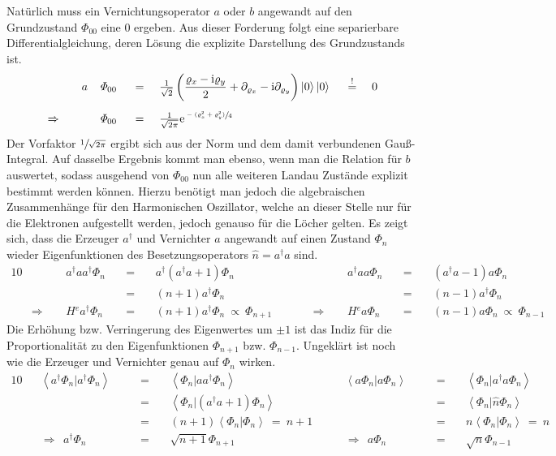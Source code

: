 \documentclass[a4paper,11pt, twoside]{article}
\newcommand{\ind}[2]{{_{#1}^{#2}}}
\newcommand{\+}{\dagger}
\newcommand{\bra}{\left \langle}
\newcommand{\ck}{\left |}
\newcommand{\ket}{\right \rangle}
\renewcommand{\'}{\tt\textquotesingle}
\renewcommand{\a}{a\ind{}{\+}}
\renewcommand{\exp}[1]{\tt{e}^{#1}}
\renewcommand{\it}{\mathit}
\renewcommand{\^}{\hat}
\renewcommand{\tt}{\text}
\renewcommand{\~}{\widetilde}
\begin{document}
Natürlich muss ein Vernichtungsoperator $a$ oder $b$ angewandt auf den Grundzustand $\it{\Phi}_{00}$ eine $0$ ergeben. Aus dieser Forderung folgt eine separierbare Differentialgleichung, deren Lösung die explizite Darstellung des Grundzustands ist. 
\begin{alignat*}{7}
& && a&&\it{\Phi}_{00} &&\ =\ && \tfrac{1}{\sqrt{2}}\left (\frac{\varrho_x -\tt i\varrho_y}{2}+\partial_{\varrho_x}-\tt i \partial_{\varrho_y}\right )\ck 0\ket \ck 0\ket &&\ \stackrel{!}{=} \ &&0 \\[5pt]
& \Rightarrow  \quad  && &&\it{\Phi}_{00} &&\ = \ && \tfrac{1}{\sqrt{2\pi}}\exp{\sfrac{-(\varrho_x ^2 + \varrho_y ^2)}{4}}
\end{alignat*}
Der Vorfaktor $\sfrac{1}{\sqrt{2\pi}}$ ergibt sich aus der Norm und dem damit verbundenen Gauß-Integral. Auf dasselbe Ergebnis kommt man ebenso, wenn man die Relation für $b$ auswertet, sodass ausgehend von $\it{\Phi}_{00}$ nun alle weiteren Landau Zustände explizit bestimmt werden können. Hierzu benötigt man jedoch die algebraischen Zusammenhänge für den Harmonischen Oszillator, welche an dieser Stelle nur für die Elektronen aufgestellt werden, jedoch genauso für die Löcher gelten. Es zeigt sich, dass die Erzeuger $a\ind{}{\+}$ und Vernichter $a$ angewandt auf einen Zustand  $\it\Phi_{n}$ wieder Eigenfunktionen des Besetzungsoperators  $\^n = a\ind{}{\+}a$ sind. 
\begin{alignat*}{10}
& &&a\ind{}{\+}aa\ind{}{\+}\it{\Phi}_{n} &&\ = \ && a\ind{}{\+}(a\ind{}{\+}a+1)\it{\Phi}_{n}  &&
   	&&a\ind{}{\+}aa \it{\Phi}_{n} &&\ = \ && (a\ind{}{\+}a-1)a\it{\Phi}_{n} \\
& &&  &&\ = \ && (n+1)a\ind{}{\+}\it{\Phi}_{n}  && 
	&&  &&\ = \ && (n-1)a\ind{}{\+}\it{\Phi}_{n} \\[6pt]
& \Rightarrow  \ \ && H\ind{}{e}  a\ind{}{\+}\it{\Phi}_{n}  &&\ = \ && (n+1)a\ind{}{\+}\it{\Phi}_{n}\ \propto \ \it{\Phi}_{n+1} \qquad  &&
  \Rightarrow  \ \ &&  H\ind{}{e} a \it{\Phi}_{n}  &&\ = \ && (n-1)a \it{\Phi}_{n}\ \propto \ \it{\Phi}_{n-1}
\end{alignat*}
Die Erhöhung bzw. Verringerung des Eigenwertes um $\pm1$ ist das Indiz für die Proportionalität zu den Eigenfunktionen $\it{\Phi}_{n+1}$ bzw. $\it{\Phi}_{n-1}$. Ungeklärt ist noch wie die Erzeuger und Vernichter genau auf $\it{\Phi}_n$ wirken. 
\begin{alignat*}{10}
& &\bra \a \it{\Phi}_{n} |\a \it{\Phi}_{n}  \ket & &&\ = \ && \bra  \it{\Phi}_{n} |a\a \it{\Phi}_{n}  \ket  && \ \
   	&\bra a \it{\Phi}_{n} |a \it{\Phi}_{n}  \ket & &&\ = \ && \bra  \it{\Phi}_{n} |\a a \it{\Phi}_{n}  \ket \\
& &&  &&\ = \ && \bra  \it{\Phi}_{n} |(\a a+1) \it{\Phi}_{n}  \ket && 
	&&  &&\ = \ && \bra  \it{\Phi}_{n} |\^n \it{\Phi}_{n}  \ket \\
	& &&  &&\ = \ && (n+1)\bra  \it{\Phi}_{n} | \it{\Phi}_{n}\ket  \ \stackrel{}{=}\ n+1  && 
	&&  &&\ = \ && n \bra  \it{\Phi}_{n} |\it{\Phi}_{n}  \ket \ \stackrel{}{=}\ n \\[8pt]
&  & \Rightarrow  \ \ a\ind{}{\+}\it{\Phi}_{n}&  &&\ = \ && \sqrt{n+1}\it{\Phi}_{n+1} \qquad  &&
  &  \Rightarrow  \ \ a \it{\Phi}_{n}  & &&\ = \ && \sqrt{n}\it{\Phi}_{n-1}
\end{alignat*}
\end{document}
